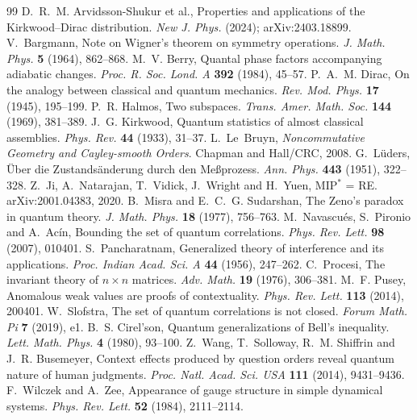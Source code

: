 \documentclass[11pt]{article}
\theoremstyle{definition}\newtheorem{definition}[theorem]{Definition}\newtheorem{remark}[theorem]{Remark}\newtheorem{example}[theorem]{Example}
\begin{document}
\begin{thebibliography}{99}
 D.~R.~M. Arvidsson-Shukur et al., Properties and applications of the Kirkwood--Dirac distribution.
  \emph{New J. Phys.} (2024); arXiv:2403.18899.
 V.~Bargmann, Note on Wigner's theorem on symmetry operations. \emph{J. Math. Phys.} \textbf{5} (1964), 862--868.
 M.~V. Berry, Quantal phase factors accompanying adiabatic changes. \emph{Proc. R. Soc. Lond. A} \textbf{392} (1984), 45--57.
 P.~A.~M. Dirac, On the analogy between classical and quantum mechanics. \emph{Rev. Mod. Phys.} \textbf{17} (1945), 195--199.
 P.~R. Halmos, Two subspaces. \emph{Trans. Amer. Math. Soc.} \textbf{144} (1969), 381--389.
 J.~G. Kirkwood, Quantum statistics of almost classical assemblies. \emph{Phys. Rev.} \textbf{44} (1933), 31--37.
 L.~Le~Bruyn, \emph{Noncommutative Geometry and Cayley-smooth Orders}. Chapman and Hall/CRC, 2008.
 G.~L\"uders, \"Uber die Zustands\"anderung durch den Me\ss prozess. \emph{Ann. Phys.} \textbf{443} (1951), 322--328.
 Z.~Ji, A.~Natarajan, T.~Vidick, J.~Wright and H.~Yuen, MIP$^*$ = RE. arXiv:2001.04383, 2020.
 B.~Misra and E.~C.~G. Sudarshan, The Zeno's paradox in quantum theory. \emph{J. Math. Phys.} \textbf{18} (1977), 756--763.
 M.~Navascu\'es, S.~Pironio and A.~Ac\'in, Bounding the set of quantum correlations. \emph{Phys. Rev. Lett.} \textbf{98} (2007), 010401.
 S.~Pancharatnam, Generalized theory of interference and its applications. \emph{Proc. Indian Acad. Sci. A}
  \textbf{44} (1956), 247--262.
 C.~Procesi, The invariant theory of $n\times n$ matrices. \emph{Adv. Math.} \textbf{19} (1976), 306--381.
 M.~F. Pusey, Anomalous weak values are proofs of contextuality. \emph{Phys. Rev. Lett.} \textbf{113} (2014), 200401.
 W.~Slofstra, The set of quantum correlations is not closed. \emph{Forum Math. Pi} \textbf{7} (2019), e1.
 B.~S. Cirel'son, Quantum generalizations of Bell's inequality. \emph{Lett. Math. Phys.} \textbf{4} (1980), 93--100.
 Z.~Wang, T.~Solloway, R.~M. Shiffrin and J.~R. Busemeyer, Context effects produced by question orders reveal
  quantum nature of human judgments. \emph{Proc. Natl. Acad. Sci. USA} \textbf{111} (2014), 9431--9436.
 F.~Wilczek and A.~Zee, Appearance of gauge structure in simple dynamical systems. \emph{Phys. Rev. Lett.}
  \textbf{52} (1984), 2111--2114.

\end{thebibliography}
\end{document}
